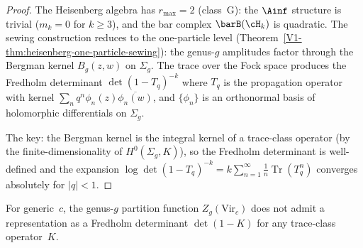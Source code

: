 \begin{proof}
The Heisenberg algebra has $r_{\max} = 2$ (class~G): the
$\Ainf$ structure is trivial ($m_k = 0$ for $k \ge 3$), and
the bar complex $\barB(\cH_k)$ is quadratic. The sewing
construction reduces to the one-particle level
(Theorem~\ref{V1-thm:heisenberg-one-particle-sewing}): the
genus-$g$ amplitudes factor through the Bergman kernel
$B_g(z,w)$ on $\Sigma_g$. The trace over the Fock space
produces the Fredholm determinant $\det(1 - T_q)^{-k}$ where
$T_q$ is the propagation operator with kernel
$\sum_n q^n \phi_n(z)\overline{\phi_n(w)}$, and
$\{\phi_n\}$ is an orthonormal basis of holomorphic differentials
on $\Sigma_g$.

The key: the Bergman kernel is the integral kernel of a
trace-class operator (by the finite-dimensionality of
$H^0(\Sigma_g, K)$), so the Fredholm determinant is well-defined
and the expansion
$\log\det(1-T_q)^{-k} = k\sum_{n=1}^\infty
\frac{1}{n}\operatorname{Tr}(T_q^n)$
converges absolutely for $|q| < 1$.
\end{proof}

\begin{theorem}
\label{thm:gravity-virasoro-not-fredholm}
For generic~$c$, the genus-$g$ partition function
$Z_g(\mathrm{Vir}_c)$ does not admit a representation as
a Fredholm determinant $\det(1 - K)$ for any trace-class
operator~$K$.
\end{theorem}

